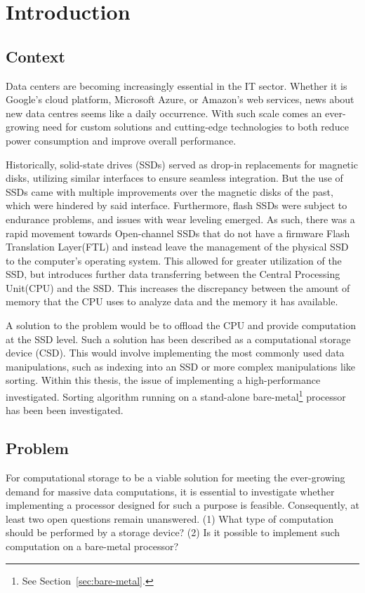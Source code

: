 \section{Introduction}
\subsection{Context}\label{sec:context}
Data centers are becoming increasingly essential in the IT sector. Whether it is
Google's cloud platform, Microsoft Azure, or Amazon's web services, news about
new data centres seems like a daily occurrence\cite{datacenters}. With such scale comes an
ever-growing need for custom solutions and cutting-edge technologies to both
reduce power consumption and improve overall performance.

Historically, solid-state drives (SSDs) served as drop-in replacements for
magnetic disks, utilizing similar interfaces to ensure seamless integration. But
the use of SSDs came with multiple improvements over the magnetic disks of the
past, which were hindered by said interface. Furthermore, flash SSDs were
subject to endurance problems, and issues with wear leveling
emerged\cite{write_endurance, NAND_future}. As such, there was a rapid movement
towards Open-channel SSDs that do not have a firmware Flash Translation
Layer(FTL) and instead leave the management of the physical SSD to the
computer's operating system\cite{LightNVM, open-channel}. This allowed for
greater utilization of the SSD, but introduces further data transferring between
the Central Processing Unit(CPU) and the SSD. This increases the discrepancy
between the amount of memory that the CPU uses to analyze data and the memory it
has available\cite{CSDWhereAreWe}.

A solution to the problem would be to offload the CPU and provide computation at
the SSD level. Such a solution has been described as a computational storage
device (CSD). This would involve implementing the most commonly used data
manipulations, such as indexing into an SSD or more complex manipulations like
sorting. Within this thesis, the issue of implementing a high-performance
investigated. Sorting algorithm running on a stand-alone
bare-metal\footnote{\label{note:1}See Section~\ref{sec:bare-metal}.} processor
has been been investigated.


\subsection{Problem}\label{sec:problem}
For computational storage to be a viable solution for meeting the ever-growing
demand for massive data computations, it is essential to investigate whether
implementing a processor designed for such a purpose is feasible. Consequently,
at least two open questions remain unanswered. (1) What type of computation should be
performed by a storage device? (2) Is it possible to implement such computation
on a bare-metal processor?


